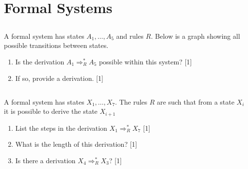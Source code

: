 \documentclass[twocolumn]{article}
\newcounter{pmarks}
\newcounter{marks}
\newcommand\mrk[1]{{\hfill\color{blue}\small[{#1}]}\addtocounter{pmarks}{#1}\addtocounter{marks}{#1}}
\begin{document}
\section{Formal Systems}

\subsection{}

    A formal system has states $A_1, \dots, A_5$ and rules $R$. Below is a graph showing all possible transitions between states.

    \begin{figure}[h!]
        \centering
    \end{figure}

    \begin{enumerate}
        \item Is the derivation $A_1 \Rightarrow^*_R A_5$ possible within this system? \mrk{1}
        \item If so, provide a derivation. \mrk{1}
    \end{enumerate}

\subsection{}

    A formal system has states $X_1, \dots, X_{7}$. The rules $R$ are such that from a state $X_i$ it is possible to derive the state $X_{i+1}$

    \begin{enumerate}
        \item List the steps in the derivation $X_1 \Rightarrow^*_R X_7$ \mrk{1}
        \item What is the length of this derivation? \mrk{1}
        \item Is there a derivation $X_4 \Rightarrow^*_R X_3$? \mrk{1}
    \end{enumerate}
\end{document}
